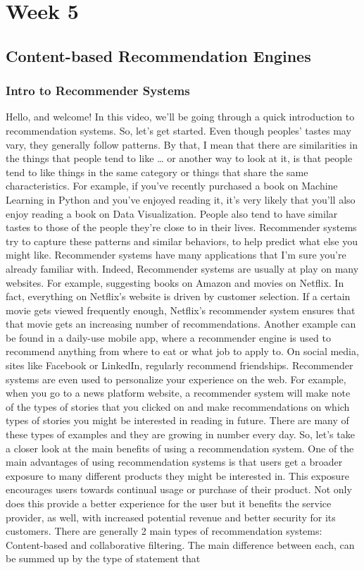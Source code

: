 \chapter{Week 5}

\section{Content-based Recommendation Engines}

	\subsection{Intro to Recommender Systems}
	
	
	Hello, and welcome! In this video, we’ll be going through a quick introduction to recommendation systems. So, let’s get started. Even though peoples’ tastes may vary, they generally follow patterns. By that, I mean that there are similarities in the things that people tend to like … or another way to look at it, is that people tend to like things in the same category or things that share the same characteristics. For example, if you’ve recently purchased a book on Machine Learning in Python and you’ve enjoyed reading it, it’s very likely that you’ll also enjoy reading a book on Data Visualization. People also tend to have similar tastes to those of the people they’re close to in their lives. Recommender systems try to capture these patterns and similar behaviors, to help predict what else you might like. Recommender systems have many applications that I’m sure you’re already familiar with. Indeed, Recommender systems are usually at play on many websites. For example, suggesting books on Amazon and movies on Netflix. In fact, everything on Netflix’s website is driven by customer selection. If a certain movie gets viewed frequently enough, Netflix’s recommender system ensures that that movie gets an increasing number of recommendations. Another example can be found in a daily-use mobile app, where a recommender engine is used to recommend anything from where to eat or what job to apply to. On social media, sites like Facebook or LinkedIn, regularly recommend friendships. Recommender systems are even used to personalize your experience on the web. For example, when you go to a news platform website, a recommender system will make note of the types of stories that you clicked on and make recommendations on which types of stories you might be interested in reading in future. There are many of these types of examples and they are growing in number every day. So, let’s take a closer look at the main benefits of using a recommendation system. One of the main advantages of using recommendation systems is that users get a broader exposure to many different products they might be interested in. This exposure encourages users towards continual usage or purchase of their product. Not only does this provide a better experience for the user but it benefits the service provider, as well, with increased potential revenue and better security for its customers. There are generally 2 main types of recommendation systems: Content-based and collaborative filtering. The main difference between each, can be summed up by the type of statement that 